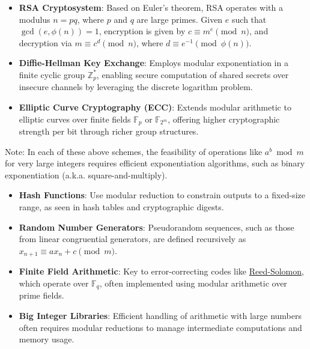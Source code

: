 \documentclass[12pt,openany]{book}
\theoremstyle{definition}
\theoremstyle{plain}
\theoremstyle{remark}
\begin{document}
\begin{itemize}
  \item \textbf{RSA Cryptosystem}: Based on Euler's theorem, RSA operates with a modulus $n = pq$, where $p$ and $q$ are large primes. Given $e$ such that $\gcd(e, \phi(n)) = 1$, encryption is given by $c \equiv m^e \pmod{n}$, and decryption via $m \equiv c^d \pmod{n}$, where $d \equiv e^{-1} \pmod{\phi(n)}$.

  \item \textbf{Diffie-Hellman Key Exchange}: Employs modular exponentiation in a finite cyclic group $\mathbb{Z}_p^*$, enabling secure computation of shared secrets over insecure channels by leveraging the discrete logarithm problem.

  \item \textbf{Elliptic Curve Cryptography (ECC)}: Extends modular arithmetic to elliptic curves over finite fields $\mathbb{F}_p$ or $\mathbb{F}_{2^m}$, offering higher cryptographic strength per bit through richer group structures.
\end{itemize}
\noindent
Note: In each of these above schemes, the feasibility of operations like $a^b \bmod m$ for very large integers requires efficient exponentiation algorithms, such as binary exponentiation (a.k.a. square-and-multiply).
\begin{itemize}
  \item \textbf{Hash Functions}: Use modular reduction to constrain outputs to a fixed-size range, as seen in hash tables and cryptographic digests.
  \item \textbf{Random Number Generators}: Pseudorandom sequences, such as those from linear congruential generators, are defined recursively as $x_{n+1} \equiv ax_n + c \pmod{m}$.
  \item \textbf{Finite Field Arithmetic}: Key to error-correcting codes like \href{https://en.wikipedia.org/wiki/Reed%E2%80%93Solomon_error_correction}{Reed-Solomon}, which operate over $\mathbb{F}_q$, often implemented using modular arithmetic over prime fields.
  \item \textbf{Big Integer Libraries}: Efficient handling of arithmetic with large numbers often requires modular reductions to manage intermediate computations and memory usage.
\end{itemize}
\end{document}
